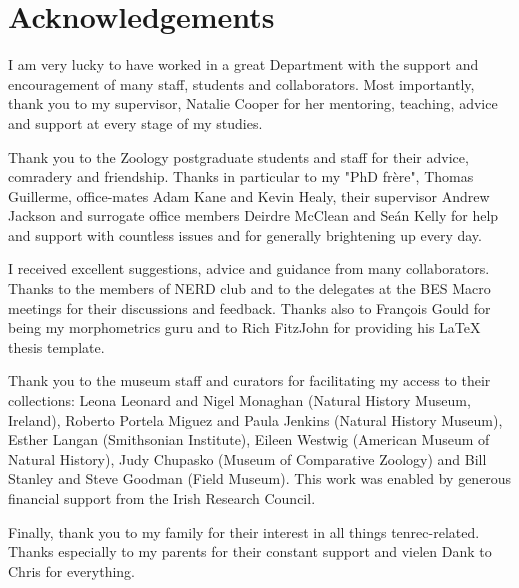 
\chapter*{Acknowledgements}

I am very lucky to have worked in a great Department with the support and encouragement of many staff, students and collaborators. Most importantly, thank you to my supervisor, Natalie Cooper for her mentoring, teaching, advice and support at every stage of my studies. 

Thank you to the Zoology postgraduate students and staff for their advice, comradery and friendship. Thanks in particular to my "PhD fr\`{e}re", Thomas Guillerme, office-mates Adam Kane and Kevin Healy, their supervisor Andrew Jackson and surrogate office members Deirdre McClean and Se\'{a}n Kelly for help and support with countless issues and for generally brightening up every day.

I received excellent suggestions, advice and guidance from many collaborators. Thanks to the members of NERD club and to the delegates at the BES Macro meetings for their discussions and feedback. Thanks also to Fran\c{c}ois Gould for being my morphometrics guru and to Rich FitzJohn for providing his LaTeX thesis template. 

Thank you to the museum staff and curators for facilitating my access to their collections: Leona Leonard and Nigel Monaghan (Natural History Museum, Ireland), Roberto Portela Miguez and Paula Jenkins (Natural History Museum), Esther Langan (Smithsonian Institute), Eileen Westwig (American Museum of Natural History), Judy Chupasko (Museum of Comparative Zoology) and Bill Stanley and Steve Goodman (Field Museum). This work was enabled by generous financial support from the Irish Research Council.

Finally, thank you to my family for their interest in all things tenrec-related. Thanks especially to my parents for their constant support and vielen Dank to Chris for everything. 